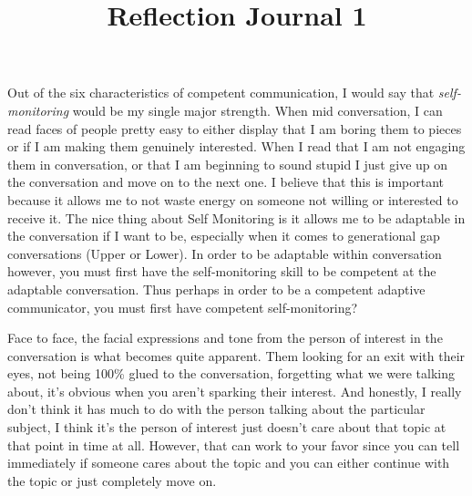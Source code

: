 \documentclass[12pt]{article}
\begin{document}
\title{Reflection Journal 1}




\par
Out of the six characteristics of competent communication, I would say that \emph{self-monitoring} would be my single major strength. When mid conversation, I can read faces of people pretty easy to either display that I am boring them to pieces or if I am making them genuinely interested. When I read that I am not engaging them in conversation, or that I am beginning to sound stupid I just give up on the conversation and move on to the next one. I believe that this is important because it allows me to not waste energy on someone not willing or interested to receive it. The nice thing about Self Monitoring is it allows me to be adaptable in the conversation if I want to be, especially when it comes to generational gap conversations (Upper or Lower). In order to be adaptable within conversation however, you must first have the self-monitoring skill to be competent at the adaptable conversation. Thus perhaps in order to be a competent adaptive communicator, you must first have competent self-monitoring?
\par 
Face to face, the facial expressions and tone from the person of interest in the conversation is what becomes quite apparent. Them looking for an exit with their eyes, not being 100\% glued to the conversation, forgetting what we were talking about, it's obvious when you aren't sparking their interest. And honestly, I really don't think it has much to do with the person talking about the particular subject, I think it's the person of interest just doesn't care about that topic at that point in time at all. However, that can work to your favor since you can tell immediately if someone cares about the topic and you can either continue with the topic or just completely move on.
\end{document}

